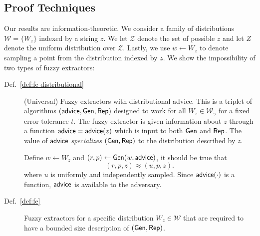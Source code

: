 

\subsection{Proof Techniques}
Our results are information-theoretic. We
consider a family of distributions $\mathcal{W} = \{ W_z \}$ indexed by a string $z$.  We let $\mathcal{Z}$ denote the set of possible $z$ and let $Z$
denote the uniform distribution over $\mathcal{Z}$.   
Lastly, we use $w\leftarrow W_z$ to
denote sampling a point from the distribution indexed by $z$.  We show the
impossibility of two types of fuzzy extractors:
\begin{description}
\item[Def.~\ref{def:fe distributional}] (Universal) Fuzzy extractors with distributional advice.  This is a triplet of algorithms $({\mathsf{advice}}, {\mathsf{Gen}}, {\mathsf{Rep}})$ designed to work for all $W_z \in \mathcal{W}_\gamma$ for a fixed error tolerance $t$.  The fuzzy extractor is given information about $z$ through a function ${\mathsf{advice}} = {\mathsf{advice}}(z)$ which is input to both ${\mathsf{Gen}}$ and ${\mathsf{Rep}}$. The value of ${\mathsf{advice}}$ \emph{specializes} $({\mathsf{Gen}}, {\mathsf{Rep}})$ to the distribution described by $z$. 

Define $w\leftarrow W_z$ and $(r, p) \leftarrow {\ensuremath{\mathsf{Gen}}}(w, {\mathsf{advice}})$, it should be true that 
\[
(r, p, z) \approx (u, p, z).
\] 
where $u$ is uniformly and independently sampled.  Since ${\mathsf{advice}}(\cdot)$ is a function, ${\mathsf{advice}}$ is available to the adversary. 
\item[Def.~\ref{def:fe}] Fuzzy extractors for a specific distribution $W_z \in \mathcal{W}$ that are required to have a bounded size description of $({\mathsf{Gen}}, {\mathsf{Rep}})$.
\end{description}

